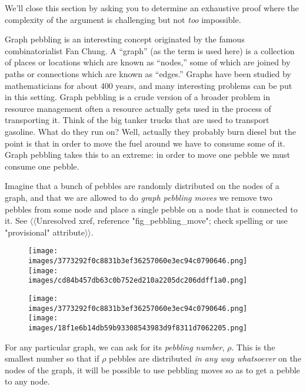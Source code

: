 \documentclass[10pt,]{book}
\theoremstyle{plain}
\theoremstyle{definition}
\theoremstyle{definition}
\numberwithin{equation}{section}
\begin{document}
    We'll close this section by asking you to determine an exhaustive proof where
    the complexity of the argument is challenging but not \emph{too} impossible.
\par

     Graph pebbling is an interesting concept originated
    by the famous combinatorialist  Fan Chung. A ``graph''
    (as the term is used here) is a collection
    of places or locations which are known as ``nodes,'' some of which
    are joined by paths or connections which are known as ``edges.''
    Graphs have been studied by mathematicians for about 400 years, and
    many interesting problems can be put in this setting. Graph pebbling
    is a crude version of a broader problem in resource management \textemdash{} often
    a resource actually gets used in the process of transporting it. Think of
    the big tanker trucks that are used to transport gasoline. What do they
    run on? Well, actually they probably burn diesel \textemdash{} but the point is
    that in order to move the fuel around we have to consume some of it.
    Graph pebbling takes this to an extreme: in order to move one pebble
    we must consume one pebble.
\par

    Imagine that a bunch of pebbles are randomly
    distributed on the nodes of a graph, and that we are allowed to do
    \emph{graph pebbling moves} \textemdash{} we remove two pebbles from some node
    and place a single pebble on a node that is connected to it.
    See {$\langle\langle$Unresolved xref, reference "fig\_pebbling\_move"; check spelling or use "provisional" attribute$\rangle\rangle$}.
\leavevmode%
\begin{figure}
\centering
\texttt{[image: images/3773292f0c8831b3ef36257060e3ec94c0790646.png]}
\texttt{[image: images/cd84b457db63c0b752ed210a2205dc206ddff1a0.png]}
\textemdash{}\end{figure}
\leavevmode%
\begin{figure}
\centering
\texttt{[image: images/3773292f0c8831b3ef36257060e3ec94c0790646.png]}
\texttt{[image: images/18f1e6b14db59b93308543983d9f8311d7062205.png]}
\end{figure}
\par

    For any particular graph, we can ask for its \emph{pebbling number}, \(\rho\).
    This is the smallest number so that if \(\rho\) pebbles are distributed \emph{in any way whatsoever} on the nodes of the graph, it will be possible to use
    pebbling moves so as to get a pebble to any node.
\par
\end{document}
